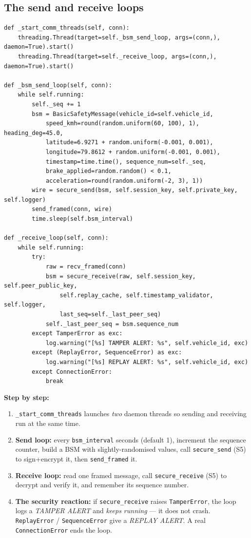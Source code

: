\documentclass[11pt,a4paper]{article}
\begin{document}
\subsection{The send and receive loops}
\begin{lstlisting}[style=py,caption={vehicle\_node.py --- the two BSM loops (one per thread).}]
def _start_comm_threads(self, conn):
    threading.Thread(target=self._bsm_send_loop, args=(conn,), daemon=True).start()
    threading.Thread(target=self._receive_loop, args=(conn,), daemon=True).start()

def _bsm_send_loop(self, conn):
    while self.running:
        self._seq += 1
        bsm = BasicSafetyMessage(vehicle_id=self.vehicle_id,
            speed_kmh=round(random.uniform(60, 100), 1), heading_deg=45.0,
            latitude=6.9271 + random.uniform(-0.001, 0.001),
            longitude=79.8612 + random.uniform(-0.001, 0.001),
            timestamp=time.time(), sequence_num=self._seq,
            brake_applied=random.random() < 0.1,
            acceleration=round(random.uniform(-2, 3), 1))
        wire = secure_send(bsm, self.session_key, self.private_key, self.logger)
        send_framed(conn, wire)
        time.sleep(self.bsm_interval)

def _receive_loop(self, conn):
    while self.running:
        try:
            raw = recv_framed(conn)
            bsm = secure_receive(raw, self.session_key, self.peer_public_key,
                self.replay_cache, self.timestamp_validator, self.logger,
                last_seq=self._last_peer_seq)
            self._last_peer_seq = bsm.sequence_num
        except TamperError as exc:
            log.warning("[%s] TAMPER ALERT: %s", self.vehicle_id, exc)
        except (ReplayError, SequenceError) as exc:
            log.warning("[%s] REPLAY ALERT: %s", self.vehicle_id, exc)
        except ConnectionError:
            break
\end{lstlisting}
\textbf{Step by step:}
\begin{enumerate}
  \item \texttt{\_start\_comm\_threads} launches \emph{two} daemon threads so
        sending and receiving run at the same time.
  \item \textbf{Send loop:} every \texttt{bsm\_interval} seconds (default 1),
        increment the sequence counter, build a BSM with slightly-randomised
        values, call \texttt{secure\_send} (S5) to sign+encrypt it, then
        \texttt{send\_framed} it.
  \item \textbf{Receive loop:} read one framed message, call
        \texttt{secure\_receive} (S5) to decrypt and verify it, and remember its
        sequence number.
  \item \textbf{The security reaction:} if \texttt{secure\_receive} raises
        \texttt{TamperError}, the loop logs a \emph{TAMPER ALERT} and
        \emph{keeps running} --- it does not crash. \texttt{ReplayError} /
        \texttt{SequenceError} give a \emph{REPLAY ALERT}. A real
        \texttt{ConnectionError} ends the loop.
\end{enumerate}
\end{document}
